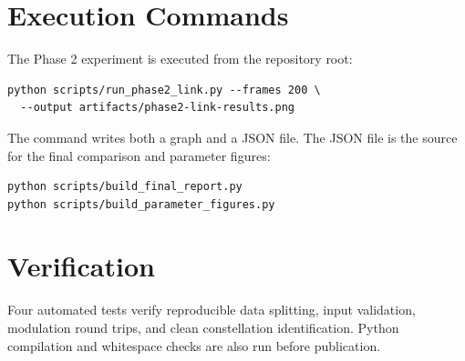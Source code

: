 \section{Execution Commands}
The Phase 2 experiment is executed from the repository root:
\begin{verbatim}
python scripts/run_phase2_link.py --frames 200 \
  --output artifacts/phase2-link-results.png
\end{verbatim}
The command writes both a graph and a JSON file. The JSON file is the source
for the final comparison and parameter figures:
\begin{verbatim}
python scripts/build_final_report.py
python scripts/build_parameter_figures.py
\end{verbatim}

\section{Verification}
Four automated tests verify reproducible data splitting, input validation,
modulation round trips, and clean constellation identification. Python
compilation and whitespace checks are also run before publication.
